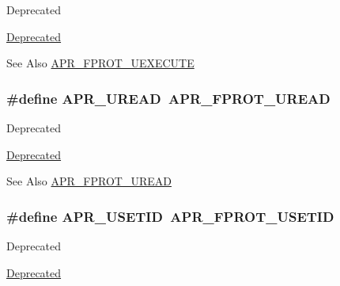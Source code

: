 \begin{DoxyRefDesc}{Deprecated}
\item[\hyperlink{deprecated__deprecated000006}{Deprecated}]\end{DoxyRefDesc}
\begin{DoxySeeAlso}{See Also}
\hyperlink{group__apr__file__permissions_ga156e1374a4ef30e745340d8c20b36d03}{A\-P\-R\-\_\-\-F\-P\-R\-O\-T\-\_\-\-U\-E\-X\-E\-C\-U\-T\-E} 
\end{DoxySeeAlso}
\hypertarget{group__apr__file__permissions_ga51dc87ecd94c98e97694e68d5d9620a0}{
\subsubsection[{A\-P\-R\-\_\-\-U\-R\-E\-A\-D}]{\setlength{\rightskip}{0pt plus 5cm}\#define A\-P\-R\-\_\-\-U\-R\-E\-A\-D~{\bf A\-P\-R\-\_\-\-F\-P\-R\-O\-T\-\_\-\-U\-R\-E\-A\-D}}}\label{group__apr__file__permissions_ga51dc87ecd94c98e97694e68d5d9620a0}
\begin{DoxyRefDesc}{Deprecated}
\item[\hyperlink{deprecated__deprecated000004}{Deprecated}]\end{DoxyRefDesc}
\begin{DoxySeeAlso}{See Also}
\hyperlink{group__apr__file__permissions_gaab6c4c2e7b95f4345c248c27b3f1a655}{A\-P\-R\-\_\-\-F\-P\-R\-O\-T\-\_\-\-U\-R\-E\-A\-D} 
\end{DoxySeeAlso}
\hypertarget{group__apr__file__permissions_gafae6b531c08999345536cae5654d0d03}{
\subsubsection[{A\-P\-R\-\_\-\-U\-S\-E\-T\-I\-D}]{\setlength{\rightskip}{0pt plus 5cm}\#define A\-P\-R\-\_\-\-U\-S\-E\-T\-I\-D~{\bf A\-P\-R\-\_\-\-F\-P\-R\-O\-T\-\_\-\-U\-S\-E\-T\-I\-D}}}\label{group__apr__file__permissions_gafae6b531c08999345536cae5654d0d03}
\begin{DoxyRefDesc}{Deprecated}
\item[\hyperlink{deprecated__deprecated000003}{Deprecated}]\end{DoxyRefDesc}
